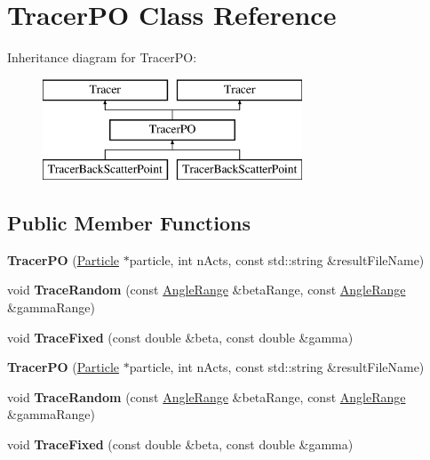 \hypertarget{class_tracer_p_o}{}\section{Tracer\+PO Class Reference}
\label{class_tracer_p_o}
Inheritance diagram for Tracer\+PO\+:\begin{figure}[H]
\begin{center}
\leavevmode
\includegraphics[height=3.000000cm]{class_tracer_p_o}
\end{center}
\end{figure}
\subsection*{Public Member Functions}
\begin{DoxyCompactItemize}
\item 
\mbox{\label{class_tracer_p_o_a0868dc6583ce53ecfc54ea4cffcfbb6a}} 
{\bfseries Tracer\+PO} (\mbox{\hyperlink{class_particle}{Particle}} $\ast$particle, int n\+Acts, const std\+::string \&result\+File\+Name)
\item 
\mbox{\label{class_tracer_p_o_a48cbbcf3794ae8b1a2ef4bb3891ba4e8}} 
void {\bfseries Trace\+Random} (const \mbox{\hyperlink{struct_angle_range}{Angle\+Range}} \&beta\+Range, const \mbox{\hyperlink{struct_angle_range}{Angle\+Range}} \&gamma\+Range)
\item 
\mbox{\label{class_tracer_p_o_a574b8cd5022759ce5d31c40b334ed395}} 
void {\bfseries Trace\+Fixed} (const double \&beta, const double \&gamma)
\item 
\mbox{\label{class_tracer_p_o_a0868dc6583ce53ecfc54ea4cffcfbb6a}} 
{\bfseries Tracer\+PO} (\mbox{\hyperlink{class_particle}{Particle}} $\ast$particle, int n\+Acts, const std\+::string \&result\+File\+Name)
\item 
\mbox{\label{class_tracer_p_o_a48cbbcf3794ae8b1a2ef4bb3891ba4e8}} 
void {\bfseries Trace\+Random} (const \mbox{\hyperlink{struct_angle_range}{Angle\+Range}} \&beta\+Range, const \mbox{\hyperlink{struct_angle_range}{Angle\+Range}} \&gamma\+Range)
\item 
\mbox{\label{class_tracer_p_o_a574b8cd5022759ce5d31c40b334ed395}} 
void {\bfseries Trace\+Fixed} (const double \&beta, const double \&gamma)
\end{DoxyCompactItemize}
